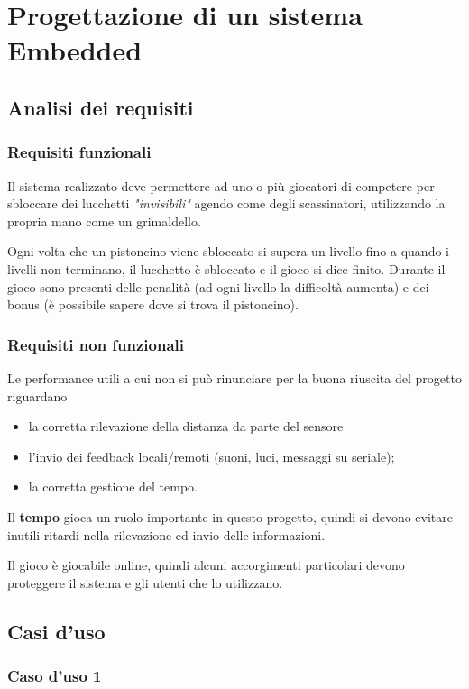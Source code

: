 \chapter{Progettazione di un sistema Embedded}
\section{Analisi dei requisiti}
\subsection{Requisiti funzionali}
Il sistema realizzato deve permettere ad uno o più giocatori di competere per sbloccare dei lucchetti \textit{"invisibili"} agendo come degli scassinatori, utilizzando la propria mano come un grimaldello. 

Ogni volta che un pistoncino viene sbloccato si supera un livello fino a quando i livelli non terminano, il lucchetto è sbloccato e il gioco si dice finito. Durante il gioco sono presenti delle penalità (ad ogni livello la difficoltà aumenta) e dei bonus (è possibile sapere dove si trova il pistoncino).

\subsection{Requisiti non funzionali}
Le performance utili a cui non si può rinunciare per la buona riuscita del progetto  riguardano
\begin{itemize}
	\item la corretta rilevazione della distanza da parte del sensore
	\item l'invio dei feedback locali/remoti (suoni, luci, messaggi su seriale);
	\item la corretta gestione del tempo.
\end{itemize}

Il \textbf{tempo} gioca un ruolo importante in questo progetto, quindi si devono evitare inutili ritardi nella rilevazione ed invio delle informazioni.

Il gioco è giocabile online, quindi alcuni accorgimenti particolari devono proteggere il sistema e gli utenti che lo utilizzano.

\clearpage
\section{Casi d'uso}
\subsection{Caso d'uso 1}

